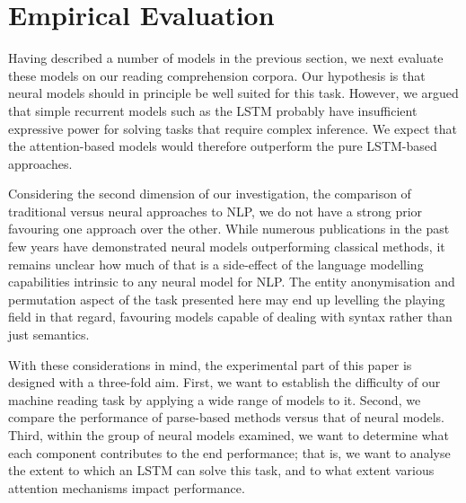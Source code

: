\section{Empirical Evaluation}
\label{experiments}


Having described a number of models in the previous section, we next evaluate
these models on our reading comprehension corpora. Our hypothesis is that neural models should in principle be well suited for this
task. However, we argued that simple recurrent models such as the LSTM
probably have insufficient expressive power for solving tasks that require
complex inference. We expect that the attention-based models would therefore
outperform the pure LSTM-based approaches.

Considering the second dimension of our investigation, the comparison of
traditional versus neural approaches to NLP, we do not have a strong prior
favouring one approach over the other. While numerous publications in the past
few years have demonstrated neural models outperforming classical methods, it
remains unclear how much of that is a side-effect of the language modelling
capabilities intrinsic to any neural model for NLP. The entity anonymisation and
permutation aspect of the task presented here may end up levelling the playing
field in that regard, favouring models capable of dealing with syntax rather
than just semantics.

With these considerations in mind, the experimental part of this paper is
designed with a three-fold aim. First, we want to establish the difficulty of our
machine reading task by applying a wide range of models to it. Second, we compare
the performance of parse-based methods versus that of neural models. Third,
within the group of neural models examined, we want to determine what each
component contributes to the end performance; that is, we want to analyse the
extent to which an LSTM can solve this task, and to what extent various
attention mechanisms impact performance.

\newcommand{\ee}[1][]{\text{\sc{e}#1}}

